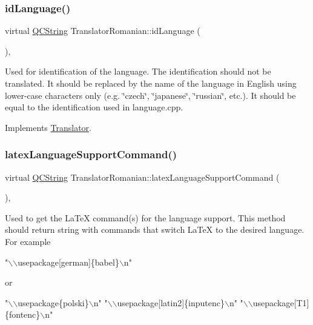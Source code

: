 \subsubsection{\texorpdfstring{idLanguage()}{idLanguage()}}
{\footnotesize\ttfamily virtual \mbox{\hyperlink{class_q_c_string}{Q\+C\+String}} Translator\+Romanian\+::id\+Language (\begin{DoxyParamCaption}{ }\end{DoxyParamCaption})\hspace{0.3cm}{\ttfamily [inline]}, {\ttfamily [virtual]}}

Used for identification of the language. The identification should not be translated. It should be replaced by the name of the language in English using lower-\/case characters only (e.\+g. \char`\"{}czech\char`\"{}, \char`\"{}japanese\char`\"{}, \char`\"{}russian\char`\"{}, etc.). It should be equal to the identification used in language.\+cpp. 

Implements \mbox{\hyperlink{class_translator}{Translator}}.

\mbox{\label{class_translator_romanian_a48989778d1d6ac6b793ce88dc4e17b10}} 
\subsubsection{\texorpdfstring{latexLanguageSupportCommand()}{latexLanguageSupportCommand()}}
{\footnotesize\ttfamily virtual \mbox{\hyperlink{class_q_c_string}{Q\+C\+String}} Translator\+Romanian\+::latex\+Language\+Support\+Command (\begin{DoxyParamCaption}{ }\end{DoxyParamCaption})\hspace{0.3cm}{\ttfamily [inline]}, {\ttfamily [virtual]}}

Used to get the La\+TeX command(s) for the language support. This method should return string with commands that switch La\+TeX to the desired language. For example 
\begin{DoxyPre}"\(\backslash\)\(\backslash\)usepackage[german]\{babel\}\(\backslash\)n"
 \end{DoxyPre}
 or 
\begin{DoxyPre}"\(\backslash\)\(\backslash\)usepackage\{polski\}\(\backslash\)n"
 "\(\backslash\)\(\backslash\)usepackage[latin2]\{inputenc\}\(\backslash\)n"
 "\(\backslash\)\(\backslash\)usepackage[T1]\{fontenc\}\(\backslash\)n"
 \end{DoxyPre}


